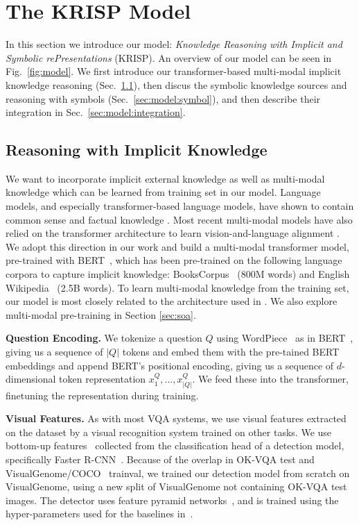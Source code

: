 \documentclass[final]{cvpr}
\providecommand{\ModelName}{KRISP\xspace}
\providecommand{\ModelNameLong}{Knowledge Reasoning with Implicit and  Symbolic rePresentations\xspace}
\providecommand{\myparagraph}[1]{\noindent\textbf{#1.}}
\providecommand{\sectionvspace}{\vspace{-0cm}}
\begin{document}
\sectionvspace
\section{The \ModelName Model}
\sectionvspace
In this section we introduce our model: \emph{\ModelNameLong} (\ModelName). An overview of our model can be seen in Fig.~\ref{fig:model}. We first introduce our transformer-based multi-modal implicit knowledge reasoning (Sec.~\ref{sec:model:implicit}), then discus the symbolic knowledge sources and reasoning with symbols (Sec.~\ref{sec:model:symbol}), and then describe their integration in Sec.~\ref{sec:model:integration}.

\sectionvspace
\subsection{Reasoning with Implicit Knowledge}
\label{sec:model:implicit}
\sectionvspace

\label{sec:VB}
We want to incorporate implicit external knowledge as well as multi-modal knowledge which can be learned from training set in our model.
Language models, and especially transformer-based language models, have shown to contain common sense and factual knowledge \cite{petroni19emnlp, jiang2020can}.
Most recent multi-modal models have also relied on the transformer architecture to learn vision-and-language alignment \cite{li2019visualbert,lu19vilbert}. 
We adopt this direction in our work and build a multi-modal transformer model, pre-trained with BERT~\cite{devlin19bert}, which has been pre-trained on the following language corpora to capture implicit knowledge: BooksCorpus~\cite{zhu15aligning} (800M words) and English Wikipedia~\cite{wikipedia} (2.5B words).
To learn multi-modal knowledge from the training set, our model is most closely related to the architecture used in \cite{li2019visualbert}. We also explore multi-modal pre-training in Section \ref{sec:soa}.

\myparagraph{Question Encoding}
We tokenize a question $Q$ using WordPiece~\cite{wu2016google} as in BERT~\cite{devlin19bert}, giving us a sequence of $|Q|$ tokens and embed them with the pre-tained BERT embeddings and append BERT's positional encoding, giving us a sequence of $d$-dimensional token representation $x_1^Q,...,x_{|Q|}^Q$. We feed these into the transformer, finetuning the representation during training.

\myparagraph{Visual Features}
As with most VQA systems, we use visual features extracted on the dataset by a visual recognition system trained on other tasks.
We use bottom-up features~\cite{anderson2018bottom} collected from the classification head of a detection model, specifically Faster R-CNN~\cite{renNIPS15fasterrcnn}. Because of the overlap in OK-VQA test and VisualGenome/COCO~\cite{LinMBHPRDZ14} trainval, we trained our detection model from scratch on VisualGenome, using a new split of VisualGenome not containing OK-VQA test images. The detector uses feature pyramid networks~\cite{lin2017feature}, and is trained using the hyper-parameters used for the baselines in~\cite{jiang2020defense}. 
\end{document}
